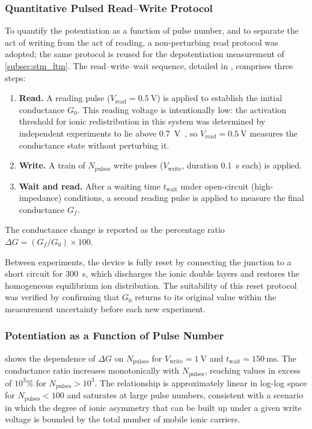 \documentclass[12pt, twoside]{report}
\begin{document}
\subsubsection{Quantitative Pulsed Read--Write Protocol}

To quantify the potentiation as a function of pulse number, and to separate the act of writing from the act of reading, a non-perturbing read protocol was adopted; the same protocol is reused for the depotentiation measurement of \cref{subsec:stm_ltm}. The read--write--wait sequence, detailed in , comprises three steps:
\begin{enumerate}
  \item \textbf{Read.} A reading pulse ($V_{\mathrm{read}} = \SI{0.5}{\volt}$) is applied to establish the initial conductance $G_0$. This reading voltage is intentionally low: the activation threshold for ionic redistribution in this system was determined by independent experiments to lie above \SI{0.7}{\volt}~\cite{PradoSocorro2022}, so $V_{\mathrm{read}} = \SI{0.5}{\volt}$ measures the conductance state without perturbing it.
  \item \textbf{Write.} A train of $N_{\mathrm{pulses}}$ write pulses ($V_{\mathrm{write}}$, duration \SI{0.1}{\second} each) is applied.
  \item \textbf{Wait and read.} After a waiting time $t_{\mathrm{wait}}$ under open-circuit (high-impedance) conditions, a second reading pulse is applied to measure the final conductance $G_f$.
\end{enumerate}
The conductance change is reported as the percentage ratio $\Delta G = (G_f/G_0) \times 100$.

Between experiments, the device is fully reset by connecting the junction to a short circuit for \SI{300}{\second}, which discharges the ionic double layers and restores the homogeneous equilibrium ion distribution. The suitability of this reset protocol was verified by confirming that $G_0$ returns to its original value within the measurement uncertainty before each new experiment.

\subsubsection{Potentiation as a Function of Pulse Number}

 shows the dependence of $\Delta G$ on $N_{\mathrm{pulses}}$ for $V_{\mathrm{write}} = \SI{1}{\volt}$ and $t_{\mathrm{wait}} = \SI{150}{\milli\second}$. The conductance ratio increases monotonically with $N_{\mathrm{pulses}}$, reaching values in excess of $10^3$\% for $N_{\mathrm{pulses}} > 10^3$. The relationship is approximately linear in log-log space for $N_{\mathrm{pulses}} < 100$ and saturates at large pulse numbers, consistent with a scenario in which the degree of ionic asymmetry that can be built up under a given write voltage is bounded by the total number of mobile ionic carriers.
\end{document}
